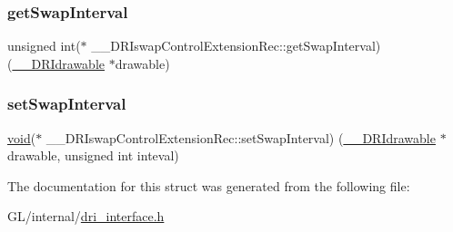 \mbox{\label{struct_____d_r_iswap_control_extension_rec_a94752c871b01da1383d6a3d68be7d764}} 
\subsubsection{\texorpdfstring{get\+Swap\+Interval}{getSwapInterval}}
{\footnotesize\ttfamily unsigned int($\ast$ \+\_\+\+\_\+\+D\+R\+Iswap\+Control\+Extension\+Rec\+::get\+Swap\+Interval) (\hyperlink{dri__interface_8h_a5bfb832a0a08208d95b3bbef439d2262}{\+\_\+\+\_\+\+D\+R\+Idrawable} $\ast$drawable)}

\mbox{\label{struct_____d_r_iswap_control_extension_rec_ae66cec8b7d62db555d6209a237995e67}} 
\subsubsection{\texorpdfstring{set\+Swap\+Interval}{setSwapInterval}}
{\footnotesize\ttfamily \hyperlink{_s_d_l__opengles2__gl2ext_8h_ae5d8fa23ad07c48bb609509eae494c95}{void}($\ast$ \+\_\+\+\_\+\+D\+R\+Iswap\+Control\+Extension\+Rec\+::set\+Swap\+Interval) (\hyperlink{dri__interface_8h_a5bfb832a0a08208d95b3bbef439d2262}{\+\_\+\+\_\+\+D\+R\+Idrawable} $\ast$drawable, unsigned int inteval)}



The documentation for this struct was generated from the following file\+:\begin{DoxyCompactItemize}
\item 
G\+L/internal/\hyperlink{dri__interface_8h}{dri\+\_\+interface.\+h}\end{DoxyCompactItemize}
